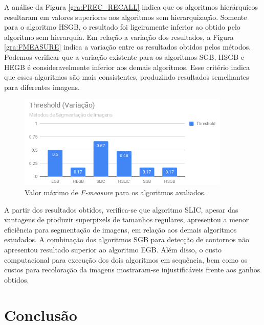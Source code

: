 \begin{document}
A análise da Figura \ref{gra:PREC_RECALL} indica que os algoritmos hierárquicos resultaram em valores superiores aos algoritmos sem hierarquização. Somente para o algoritmo HSGB, o resultado foi ligeiramente inferior ao obtido pelo algoritmo sem hierarquia. Em relação a variação dos resultados, a Figura \ref{gra:FMEASURE} indica a variação entre os resultados obtidos pelos métodos. Podemos verificar que a variação existente para os algoritmos SGB, HSGB e HEGB é consideravelmente inferior aos demais algoritmos. Esse critério indica que esses algoritmos são mais consistentes, produzindo resultados semelhantes para diferentes imagens.

\begin{figure}[ht]
\centering
\includegraphics[width=0.9\textwidth]{graph_threshold.png}
\caption{Valor máximo de \textit{F-measure} para os algoritmos avaliados.}
\label{gra:THRESHOLD}
\end{figure}

A partir dos resultados obtidos, verifica-se que algoritmo SLIC, apesar das vantagens de produzir superpixels de tamanhos regulares, apresentou a menor eficiência para segmentação de imagens, em relação aos demais algoritmos estudados. A combinação dos algoritmos SGB para detecção de contornos não apresentou resultado superior ao algoritmo EGB. Além disso, o custo computacional para execução dos dois algoritmos em sequência, bem como os custos para recoloração da imagens mostraram-se injustificáveis frente aos ganhos obtidos.



\section{Conclusão} \label{sec:conclusao}
\end{document}
